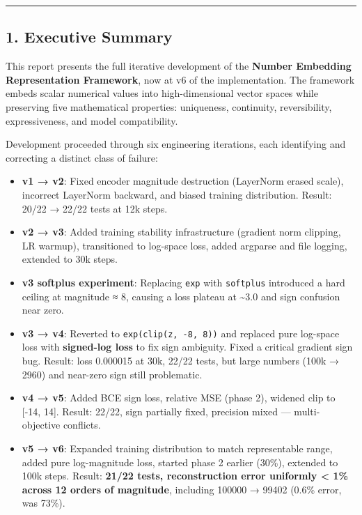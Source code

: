 \documentclass[11pt]{article}
\begin{document}
\noindent\rule{\textwidth}{0.4pt}


\subsection*{1. Executive Summary}


This report presents the full iterative development of the \textbf{Number Embedding Representation Framework}, now at v6 of the implementation. The framework embeds scalar numerical values into high-dimensional vector spaces while preserving five mathematical properties: uniqueness, continuity, reversibility, expressiveness, and model compatibility.


Development proceeded through six engineering iterations, each identifying and correcting a distinct class of failure:


\begin{itemize}
\item \textbf{v1 → v2}: Fixed encoder magnitude destruction (LayerNorm erased scale), incorrect LayerNorm backward, and biased training distribution. Result: 20/22 → 22/22 tests at 12k steps.
\item \textbf{v2 → v3}: Added training stability infrastructure (gradient norm clipping, LR warmup), transitioned to log-space loss, added argparse and file logging, extended to 30k steps.
\item \textbf{v3 softplus experiment}: Replacing \texttt{exp} with \texttt{softplus} introduced a hard ceiling at magnitude ≈ 8, causing a loss plateau at \textasciitilde{}3.0 and sign confusion near zero.
\item \textbf{v3 → v4}: Reverted to \texttt{exp(clip(z, -8, 8))} and replaced pure log-space loss with \textbf{signed-log loss} to fix sign ambiguity. Fixed a critical gradient sign bug. Result: loss 0.000015 at 30k, 22/22 tests, but large numbers (100k → 2960) and near-zero sign still problematic.
\item \textbf{v4 → v5}: Added BCE sign loss, relative MSE (phase 2), widened clip to [-14, 14]. Result: 22/22, sign partially fixed, precision mixed — multi-objective conflicts.
\item \textbf{v5 → v6}: Expanded training distribution to match representable range, added pure log-magnitude loss, started phase 2 earlier (30\%), extended to 100k steps. Result: \textbf{21/22 tests, reconstruction error uniformly < 1\% across 12 orders of magnitude}, including 100000 → 99402 (0.6\% error, was 73\%).
\end{itemize}
\end{document}
